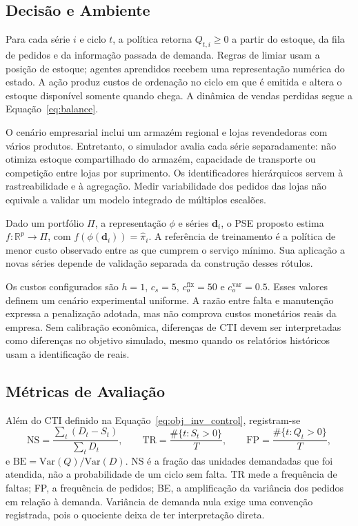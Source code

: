 \subsection{Decisão e Ambiente}
\label{sec:instanciacao_ambiente}

Para cada série $i$ e ciclo $t$, a política retorna $Q_{t,i}\geq0$ a partir do estoque, da fila de pedidos e da informação passada de demanda. Regras de limiar usam a posição de estoque; agentes aprendidos recebem uma representação numérica do estado. A ação produz custos de ordenação no ciclo em que é emitida e altera o estoque disponível somente quando chega. A dinâmica de vendas perdidas segue a Equação~\ref{eq:balance}.

O cenário empresarial inclui um armazém regional e lojas revendedoras com vários produtos. Entretanto, o simulador avalia cada série separadamente: não otimiza estoque compartilhado do armazém, capacidade de transporte ou competição entre lojas por suprimento. Os identificadores hierárquicos servem à rastreabilidade e à agregação. Medir variabilidade dos pedidos das lojas não equivale a validar um modelo integrado de múltiplos escalões.

\begin{defi}
Dado um portfólio $\Pi$, a representação $\phi$ e séries $\mathbf d_i$, o PSE proposto estima $f:\mathbb R^p\rightarrow\Pi$, com $f(\phi(\mathbf d_i))=\hat\pi_i$. A referência de treinamento é a política de menor custo observado entre as que cumprem o serviço mínimo. Sua aplicação a novas séries depende de validação separada da construção desses rótulos.
\end{defi}

Os custos configurados são $h=1$, $c_s=5$, $c_o^{\mathrm{fix}}=50$ e $c_o^{\mathrm{var}}=0.5$. Esses valores definem um cenário experimental uniforme. A razão entre falta e manutenção expressa a penalização adotada, mas não comprova custos monetários reais da empresa. Sem calibração econômica, diferenças de CTI devem ser interpretadas como diferenças no objetivo simulado, mesmo quando os relatórios históricos usam a identificação de reais.

\subsection{Métricas de Avaliação}
\label{sec:metricas_avaliacao}

Além do CTI definido na Equação~\ref{eq:obj_inv_control}, registram-se
\[
\mathrm{NS}=\frac{\sum_t(D_t-S_t)}{\sum_tD_t},\qquad
\mathrm{TR}=\frac{\#\{t:S_t>0\}}T,\qquad
\mathrm{FP}=\frac{\#\{t:Q_t>0\}}T,
\]
e $\mathrm{BE}=\mathrm{Var}(Q)/\mathrm{Var}(D)$. NS é a fração das unidades demandadas que foi atendida, não a probabilidade de um ciclo sem falta. TR mede a frequência de faltas; FP, a frequência de pedidos; BE, a amplificação da variância dos pedidos em relação à demanda. Variância de demanda nula exige uma convenção registrada, pois o quociente deixa de ter interpretação direta.

